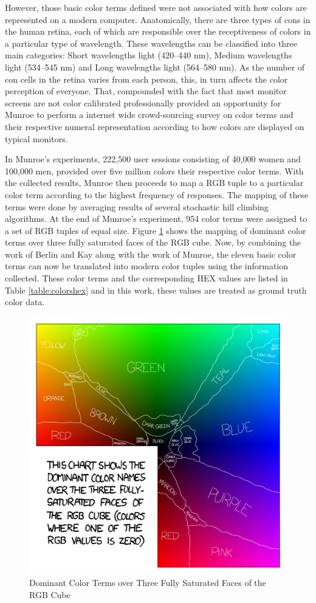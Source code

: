 However, those basic color terms defined were not associated with how colors are represented on a modern computer. Anatomically, there are three types of cons in the human retina, each of which are responsible over the receptiveness of colors in a particular type of wavelength. These wavelengths can be classified into three main categories: Short wavelengths light (420–440 nm), Medium  wavelengths light (534–545 nm) and Long wavelengths light (564–580 nm). As the number of con cells in the retina varies from each person, this, in turn affects the color perception of everyone. That, compounded with the fact that most monitor screens are not color calibrated professionally provided an opportunity for Munroe \cite{munroe2010color} to perform a internet wide crowd-sourcing survey on color terms and their respective numeral representation according to how colors are displayed on typical monitors.

In Munroe's experiments, 222,500 user sessions consisting of 40,000 women and 100,000 men, provided over five million colors their respective color terms. With the collected results, Munroe then proceeds to map a RGB tuple to a particular color term according to the highest frequency of responses. The mapping of these terms were done by averaging results of several stochastic hill climbing algorithms. At the end of Munroe's experiment, 954 color terms were assigned to a set of RGB tuples of equal size. Figure \ref{fig:xkcd} shows the mapping of dominant color terms over three fully saturated faces of the RGB cube. Now, by combining the work of Berlin and Kay along with the work of Munroe, the eleven basic color terms can now be translated into modern color tuples using the information collected. These color terms and the corresponding HEX values are listed in Table \ref{table:colorshex} and in this work, these values are treated as ground truth color data. 


\begin{figure}[hbt!]\centering
\includegraphics[width=.6\textwidth]{image/general/xkcd.png}
\caption{Dominant Color Terms over Three Fully Saturated Faces of the RGB Cube}
\label{fig:xkcd}
\end{figure}







